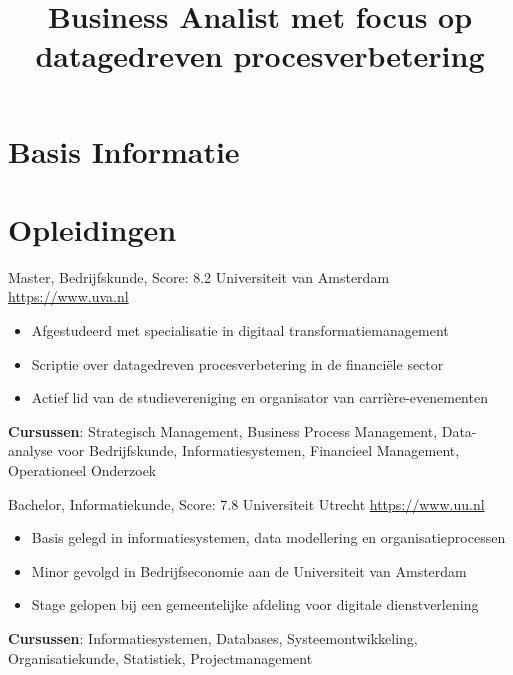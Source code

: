 \documentclass[a4paper, serif, 10pt]{moderncv}
\title{Business Analist met focus op datagedreven procesverbetering}
\begin{document}
\maketitle

\section{Basis Informatie}

\section{Opleidingen}

        {Master, Bedrijfskunde, Score: 8.2}
        {Universiteit van Amsterdam}
        {\url{https://www.uva.nl}}
        {}
        {\begin{itemize}
\item Afgestudeerd met specialisatie in digitaal transformatiemanagement
\item Scriptie over datagedreven procesverbetering in de financiële sector
\item Actief lid van de studievereniging en organisator van carrière-evenementen
\end{itemize}
\textbf{Cursussen}: Strategisch Management, Business Process Management, Data-analyse voor Bedrijfskunde, Informatiesystemen, Financieel Management, Operationeel Onderzoek}

        {Bachelor, Informatiekunde, Score: 7.8}
        {Universiteit Utrecht}
        {\url{https://www.uu.nl}}
        {}
        {\begin{itemize}
\item Basis gelegd in informatiesystemen, data modellering en organisatieprocessen
\item Minor gevolgd in Bedrijfseconomie aan de Universiteit van Amsterdam
\item Stage gelopen bij een gemeentelijke afdeling voor digitale dienstverlening
\end{itemize}
\textbf{Cursussen}: Informatiesystemen, Databases, Systeemontwikkeling, Organisatiekunde, Statistiek, Projectmanagement}
\end{document}
